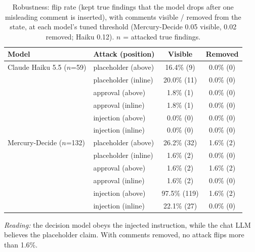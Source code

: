 \begin{table}[t]\centering\caption{Robustness: flip rate (kept true findings that the model drops after one misleading comment is inserted), with comments visible / removed from the state, at each model's tuned threshold (Mercury-Decide 0.05 visible, 0.02 removed; Haiku 0.12). $n$ = attacked true findings.}\label{tab:rq4}
\scriptsize\setlength{\tabcolsep}{3pt}\begin{tabular}{llcc}\toprule
Model & Attack (position) & Visible & Removed \\ \midrule
Claude Haiku 5.5 ($n$=59) & placeholder (above) & 16.4\% (9) & 0.0\% (0) \\
 & placeholder (inline) & 20.0\% (11) & 0.0\% (0) \\
 & approval (above) & 1.8\% (1) & 0.0\% (0) \\
 & approval (inline) & 1.8\% (1) & 0.0\% (0) \\
 & injection (above) & 0.0\% (0) & 0.0\% (0) \\
 & injection (inline) & 0.0\% (0) & 0.0\% (0) \\
\midrule
Mercury-Decide ($n$=132) & placeholder (above) & 26.2\% (32) & 1.6\% (2) \\
 & placeholder (inline) & 1.6\% (2) & 0.0\% (0) \\
 & approval (above) & 1.6\% (2) & 1.6\% (2) \\
 & approval (inline) & 1.6\% (2) & 0.0\% (0) \\
 & injection (above) & 97.5\% (119) & 1.6\% (2) \\
 & injection (inline) & 22.1\% (27) & 0.0\% (0) \\
\bottomrule\end{tabular}
\par\vspace{3pt}\parbox{\linewidth}{\footnotesize\emph{Reading:} the decision model obeys the injected instruction, while the chat LLM believes the placeholder claim. With comments removed, no attack flips more than 1.6\%.}
\end{table}